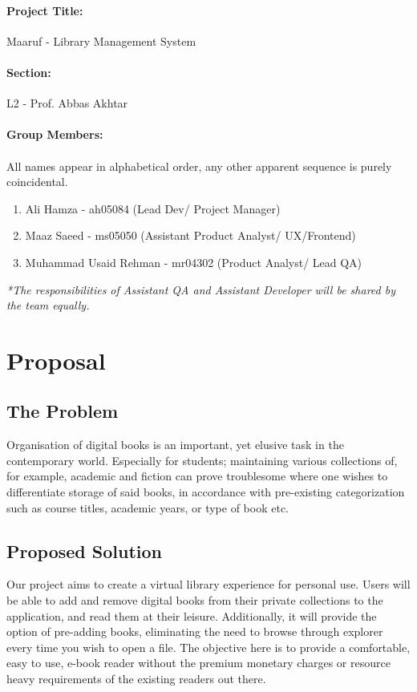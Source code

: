 \documentclass[answers]{exam}
\begin{document}
\paragraph{Project Title:} Maaruf - Library Management System
\paragraph{Section:} L2 - Prof. Abbas Akhtar
\paragraph{Group Members:}
\paragraph{}
All names appear in alphabetical order, any other apparent sequence is purely coincidental.
\begin{enumerate}
\item Ali Hamza - ah05084 (Lead Dev/ Project Manager)
\item Maaz Saeed - ms05050 (Assistant Product Analyst/ UX/Frontend)
\item Muhammad Usaid Rehman - mr04302 (Product Analyst/ Lead QA)
\end{enumerate}
\textit{*The responsibilities of Assistant QA and Assistant Developer will be shared by the team equally.}
\section{Proposal}
\subsection{The Problem}
Organisation of digital books is an important, yet elusive task in the contemporary world. Especially for students; maintaining various collections of, for example, academic and fiction can prove troublesome where one wishes to differentiate storage of said books, in accordance with pre-existing categorization such as course titles, academic years, or type of book etc.
\subsection{Proposed Solution}
Our project aims to create a virtual library experience for personal use. Users will be able to add and remove digital books from their private collections to the application, and read them at their leisure. Additionally, it will provide the option of pre-adding books, eliminating the need to browse through explorer every time you wish to open a file. The objective here is to provide a comfortable, easy to use, e-book reader without the premium monetary charges or resource heavy requirements of the existing readers out there. 
\end{document}
